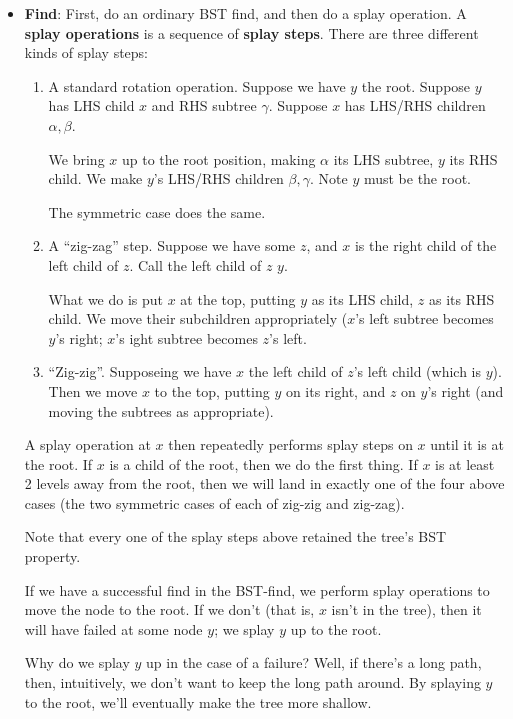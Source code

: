 \documentclass{article}
\begin{document}
\begin{itemize}
	\item
	\textbf{Find}:
	First, do an ordinary BST find, and then do a splay operation.
	A \textbf{splay operations} is a sequence of \textbf{splay steps}.
	There are three different kinds of splay steps:
	\begin{enumerate}
		\item
			A standard rotation operation. Suppose we have $y$ the root.
			Suppose $y$ has LHS child $x$ and RHS subtree $\gamma$.
			Suppose $x$ has LHS/RHS children $\alpha, \beta$.
			
			We bring $x$ up to the root position, making $\alpha$ its LHS
			subtree, $y$ its RHS child.
			We make $y$'s LHS/RHS children $\beta,\gamma$.
			Note $y$ must be the root.
			
			The symmetric case does the same.

		\item
			A ``zig-zag'' step.
			Suppose we have some $z$, and $x$ is the right child of the
			left child of $z$. Call the left child of $z$ $y$.
			
			What we do is put $x$ at the top, putting $y$ as its LHS
			child, $z$ as its RHS child.
			We move their subchildren appropriately ($x$'s left subtree
			becomes $y$'s right; $x$'s ight subtree becomes $z$'s left.
		\item
			``Zig-zig''.
			Supposeing we have $x$ the left child of $z$'s left child (which
			is $y$).
			Then we move $x$ to the top, putting $y$ on its right, and $z$
			on $y$'s right (and moving the subtrees as appropriate).
	\end{enumerate}
	A splay operation at $x$ then repeatedly performs splay steps on $x$
	until it is at the root.
	If $x$ is a child of the root, then we do the first thing.
	If $x$ is at least 2 levels away from the root, then we will land in
	exactly one of the four above cases (the two symmetric cases of each of
	zig-zig and zig-zag).
	
	Note that every one of the splay steps above retained the tree's BST 
	property.
	
	If we have a successful find in the BST-find, we perform splay operations
	to move the node to the root.
	If we don't (that is, $x$ isn't in the tree), then it will have failed
	at some node $y$; we splay $y$ up to the root.
	
	Why do we splay $y$ up in the case of a failure? Well, if there's a long
	path, then, intuitively, we don't want to keep the long path around.
	By splaying $y$ to the root, we'll eventually make the tree more shallow.
	

\end{itemize}
\end{document}
